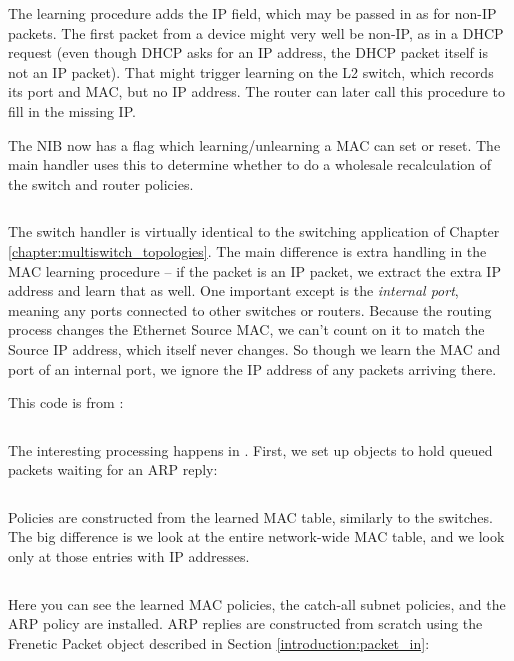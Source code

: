\inputminted[firstline=56,lastline=87]{python}{code/routing/network_information_base.py} 

The learning procedure adds the IP field, which may be passed in as 
for non-IP packets.  The first packet from a device might very well be non-IP, as in a DHCP 
request (even though DHCP asks for an IP address, the DHCP packet itself is not an IP packet).
That might trigger learning on the L2 switch, which records its port and MAC, but no IP address.  
The router can later call this procedure to fill in the missing IP.  

The NIB now has a  flag
which learning/unlearning a MAC can set or reset.  
The main handler uses this to determine whether to do 
a wholesale recalculation of the switch and router policies.

\inputminted[firstline=186]{python}{code/routing/network_information_base.py} 

The switch handler is virtually identical to the switching application of 
Chapter \ref{chapter:multiswitch_topologies}.  
The main difference is extra handling in the MAC learning procedure -- if the packet is an
IP packet, we extract the extra IP address and learn that as well.  One important except is the 
\emph{internal port}, meaning any ports connected to other switches or routers.  Because the 
routing process changes the Ethernet Source MAC, we can't count on it to match the Source IP address,
which itself never changes.  So though we learn the MAC and port of an internal port, we ignore the
IP address of any packets arriving there.  

This code is from :

\inputminted[firstline=33]{python}{code/routing/switch_handler.py}

The interesting processing happens in . First, we set up 
objects to hold queued packets waiting for an ARP reply:

\inputminted[firstline=8,lastline=12]{python}{code/routing/router_handler.py} 

Policies are constructed from the learned MAC table, similarly to the switches.  The big difference
is we look at the entire network-wide MAC table, and we look only at those entries with IP 
addresses.

\inputminted[firstline=24,lastline=53]{python}{code/routing/router_handler.py} 

Here you can see the learned MAC policies, the catch-all subnet policies, and the ARP policy are 
installed.  ARP replies are constructed from scratch using the Frenetic Packet object described in
Section \ref{introduction:packet_in}:

